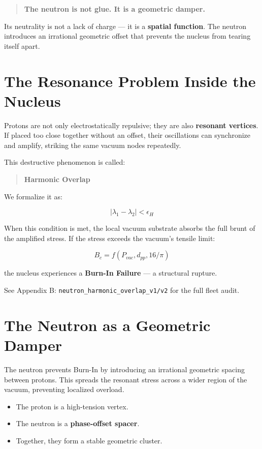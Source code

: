 \documentclass[11pt, letterpaper, openany]{book}
\begin{document}
\begin{quote}
\textbf{The neutron is not glue.  
It is a geometric damper.}
\end{quote}

Its neutrality is not a lack of charge — it is a \textbf{spatial function}.  
The neutron introduces an irrational geometric offset that prevents the nucleus from tearing itself apart.

\section{The Resonance Problem Inside the Nucleus}

Protons are not only electrostatically repulsive; they are also \textbf{resonant vertices}.  
If placed too close together without an offset, their oscillations can synchronize and amplify, striking the same vacuum nodes repeatedly.

This destructive phenomenon is called:

\begin{quote}
\textbf{Harmonic Overlap}
\end{quote}

We formalize it as:



\[
|\lambda_1 - \lambda_2| < \epsilon_H
\]



When this condition is met, the local vacuum substrate absorbs the full brunt of the amplified stress.  
If the stress exceeds the vacuum’s tensile limit:



\[
B_c = f(P_{vac}, d_{pp}, 16/\pi)
\]



the nucleus experiences a \textbf{Burn-In Failure} — a structural rupture.

See Appendix B: \texttt{neutron\_harmonic\_overlap\_v1/v2} for the full fleet audit.

\section{The Neutron as a Geometric Damper}

The neutron prevents Burn-In by introducing an irrational geometric spacing between protons.  
This spreads the resonant stress across a wider region of the vacuum, preventing localized overload.

\begin{itemize}
    \item The proton is a high-tension vertex.
    \item The neutron is a \textbf{phase-offset spacer}.
    \item Together, they form a stable geometric cluster.
\end{itemize}
\end{document}
